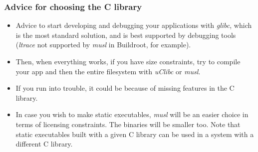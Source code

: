 \begin{frame}
  \frametitle{Advice for choosing the C library}
  \begin{itemize}
  \item Advice to start developing and debugging your applications with
        {\em glibc}, which is the most standard solution, and is best
        supported by debugging tools ({\em ltrace} not supported by {\em
        musl} in Buildroot, for example).
  \item Then, when everything works, if you have size constraints, try to compile
        your app and then the entire filesystem with {\em uClibc} or {\em musl}.
  \item If you run into trouble, it could be because of missing features
        in the C library.
  \item In case you wish to make static executables, {\em musl} will be
        an easier choice in terms of licensing constraints.
        The binaries will be smaller too.
        Note that static executables built with a given C library
        can be used in a system with a different C library.
  \end{itemize}
\end{frame}
